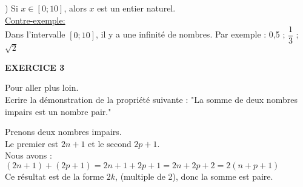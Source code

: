 \documentclass[a4paper,11pt]{article}
\newcounter{enumtabi}
\newcommand{\q}{\stepcounter{enumtabi} \theenumtabi)  }
\begin{document}
\q Si $x \in [0 ; 10]$, alors $x$ est un entier naturel.\\
\color{purple}
\underline{Contre-exemple:}\\
Dans l'intervalle $[0 ; 10]$, il y a une infinité de nombres. Par exemple : 0,5 ; $\dfrac{1}{3}$ ; $\sqrt{2}$
\color{black}

\vspace*{1cm}

\begin{large}
\textbf{EXERCICE 3}\\
\end{large}
Pour aller plus loin.\\
 Ecrire la démonstration de la propriété suivante : "La somme de deux nombres impairs est un nombre pair."\\
 
 \color{purple}

Prenons deux nombres impairs.\\
Le premier est $2n + 1$ et le second $2p + 1$.  \\

Nous avons :\\
$( 2n + 1 ) + ( 2p + 1 ) = 2n + 1 + 2p + 1 = 2 n + 2p + 2 = 2( n + p + 1 )$\\

Ce résultat est de la forme $2k$, (multiple de 2), donc la somme est paire. \\
\end{document}

